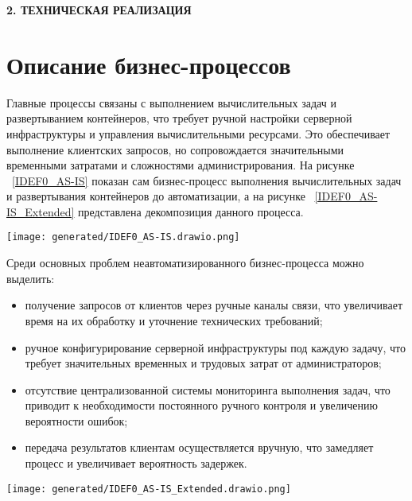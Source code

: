 \newpage
\begin{center}
  \textbf{\large 2. ТЕХНИЧЕСКАЯ РЕАЛИЗАЦИЯ}
\end{center}

\section{Описание бизнес-процессов} 

Главные процессы связаны с выполнением вычислительных задач и развертыванием контейнеров, что требует ручной настройки серверной инфраструктуры и управления вычислительными ресурсами. Это обеспечивает выполнение клиентских запросов, но сопровождается значительными временными затратами и сложностями администрирования. На рисунке ~\ref{IDEF0_AS-IS} показан сам бизнес-процесс выполнения вычислительных задач и развертывания контейнеров до автоматизации, а на рисунке ~\ref{IDEF0_AS-IS_Extended} представлена декомпозиция данного процесса.

\begin{figure*}[!t] 
  \centering
  \texttt{[image: generated/IDEF0\_AS-IS.drawio.png]}
  \caption{Процесс выполнения вычислений на удаленном сервере}
  \label{IDEF0_AS-IS}
\end{figure*}

Среди основных проблем неавтоматизированного бизнес-процесса можно выделить:
\begin{itemize}
  \item[---]получение запросов от клиентов через ручные каналы связи, что увеличивает время на их обработку и уточнение технических требований;
  \item[---]ручное конфигурирование серверной инфраструктуры под каждую задачу, что требует значительных временных и трудовых затрат от администраторов;
  \item[---]отсутствие централизованной системы мониторинга выполнения задач, что приводит к необходимости постоянного ручного контроля и увеличению вероятности ошибок;
  \item[---]передача результатов клиентам осуществляется вручную, что замедляет процесс и увеличивает вероятность задержек.
\end{itemize}

\begin{figure*}[!t]
  \centering
  \texttt{[image: generated/IDEF0\_AS-IS\_Extended.drawio.png]}
  \caption{Декомпозиция процесса выполения удаленных вычислений}
  \label{IDEF0_AS-IS_Extended}
\end{figure*}

